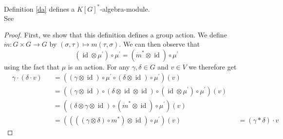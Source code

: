 \begin{proposition}
  Definition \ref{da} defines a $K[G]^\ast$-algebra-module.\\
  See \cite[A2.10]{DK15}
\end{proposition}

\begin{proof}
  First, we show that this definition defines a group action.
  We define $\dot{m} \colon G \times G \rightarrow G$ by $(\sigma,\tau) \mapsto m(\tau,\sigma)$.
  We can then observe that
  \begin{equation}
    (\operatorname{id} \otimes \mu^\prime)\circ\mu^\prime = (\dot{m}^\ast \otimes \operatorname{id}) \circ \mu^\prime
  \end{equation}
  using the fact that $\mu$ is an action.
  For any $\gamma,\delta \in G$ and $v \in V$ we therefore get
  \begin{equation}
    \begin{aligned}
      & \gamma \cdot (\delta \cdot v)
      &&= ((\gamma \otimes \operatorname{id})\circ\mu^\prime\circ(\delta \otimes \operatorname{id})\circ\mu^\prime)(v)\\
      &&&= ((\gamma \otimes \operatorname{id})\circ(\delta \otimes \operatorname{id}\otimes\operatorname{id})\circ(\operatorname{id}\otimes\mu^\prime)\circ\mu^\prime)(v)\\
      &&&= ((\delta\otimes\gamma\otimes\operatorname{id})\circ(\dot{m}^\ast\otimes\operatorname{id})\circ\mu^\prime)(v)\\
      &&&= ((((\gamma\otimes\delta)\circ m^\ast)\otimes\operatorname{id})\circ\mu^\prime)(v)
      &&= (\gamma \ast \delta) \cdot v
    \end{aligned}
  \end{equation}
  

\end{proof}
